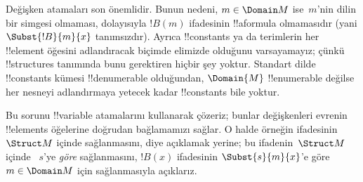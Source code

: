 \documentclass[../../../include/open-logic-section]{subfiles}
\begin{document}
\begin{explain}
Değişken atamaları son
 önemlidir. Bunun nedeni,
$m \in \Domain M$ ise~$m$'nin dilin bir simgesi olmaması, dolayısıyla
$!B(m)$ ifadesinin !!a{formula} olmamasıdır (yani
$\Subst{!B}{m}{x}$ tanımsızdır). Ayrıca !!{constant}s ya da terimlerin
her !!{element} öğesini adlandıracak biçimde elimizde olduğunu
varsayamayız; çünkü !!{structure}s tanımında bunu gerektiren hiçbir şey
yoktur. Standart dilde !!{constant}s kümesi !!{denumerable} olduğundan,
$\Domain{M}$ !!{enumerable} değilse her nesneyi adlandırmaya yetecek
kadar !!{constant}s bile yoktur.

Bu sorunu !!{variable} atamalarını kullanarak çözeriz; bunlar
değişkenleri evrenin !!{element}s öğelerine doğrudan bağlamamızı sağlar.
O halde örneğin
 ifadesinin
~$\Struct M$ içinde sağlanmasını,  diye açıklamak yerine; bu ifadenin~$\Struct M$ içinde
~$s$'ye \emph{göre} sağlanmasını, $!B(x)$ ifadesinin
$\Subst{s}{m}{x}$'e göre 
$m \in \Domain M$ için sağlanmasıyla açıklarız.
\end{explain}
\end{document}

